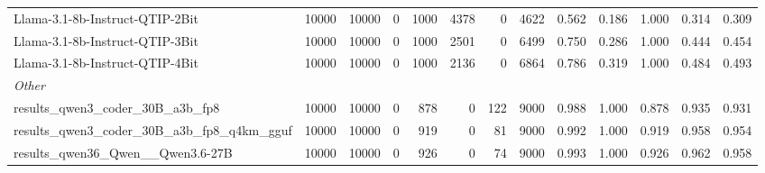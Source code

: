 \begin{table}[htbp]
{\begin{tabular}{lrrrrrrrrrrrr}
    \midrule
    Llama-3.1-8b-Instruct-QTIP-2Bit & 10000 & 10000 & 0 & 1000 & 4378 & 0 & 4622 & 0.562 & 0.186 & 1.000 & 0.314 & 0.309 \\
    Llama-3.1-8b-Instruct-QTIP-3Bit & 10000 & 10000 & 0 & 1000 & 2501 & 0 & 6499 & 0.750 & 0.286 & 1.000 & 0.444 & 0.454 \\
    Llama-3.1-8b-Instruct-QTIP-4Bit & 10000 & 10000 & 0 & 1000 & 2136 & 0 & 6864 & 0.786 & 0.319 & 1.000 & 0.484 & 0.493 \\
    \midrule
    \multicolumn{13}{l}{\textit{Other}} \\
    \midrule
    results\_qwen3\_coder\_30B\_a3b\_fp8 & 10000 & 10000 & 0 & 878 & 0 & 122 & 9000 & 0.988 & 1.000 & 0.878 & 0.935 & 0.931 \\
    results\_qwen3\_coder\_30B\_a3b\_fp8\_q4km\_gguf & 10000 & 10000 & 0 & 919 & 0 & 81 & 9000 & 0.992 & 1.000 & 0.919 & 0.958 & 0.954 \\
    results\_qwen36\_Qwen\_\_Qwen3.6-27B & 10000 & 10000 & 0 & 926 & 0 & 74 & 9000 & 0.993 & 1.000 & 0.926 & 0.962 & 0.958 \\
    \bottomrule
  \end{tabular}
  }
\end{table}

